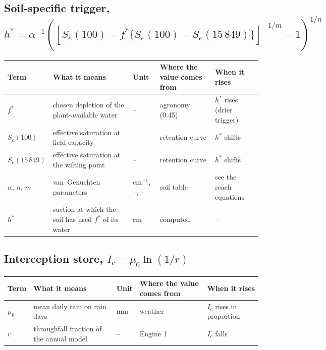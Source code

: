 \subsection*{Soil-specific trigger, $h^\ast=\alpha^{-1}([S_e(100)-f^\ast\{S_e(100)-S_e(15\,849)\}]^{-1/m}-1)^{1/n}$}
{\small\begin{longtable}{>{\raggedright\arraybackslash}p{}>{\raggedright\arraybackslash}p{}>{\raggedright\arraybackslash}p{}>{\raggedright\arraybackslash}p{}>{\raggedright\arraybackslash}p{}}\toprule Term & What it means & Unit & Where the value comes from & When it rises\\\midrule\endhead
$f^\ast$ & chosen depletion of the plant-available water & -- & agronomy (0.45) & $h^\ast$ rises (drier trigger)\\
$S_e(100)$ & effective saturation at field capacity & -- & retention curve & $h^\ast$ shifts\\
$S_e(15\,849)$ & effective saturation at the wilting point & -- & retention curve & $h^\ast$ shifts\\
$\alpha$, $n$, $m$ & van~Genuchten parameters & cm$^{-1}$, --, -- & soil table & see the reach equations\\
$h^\ast$ & suction at which the soil has used $f^\ast$ of its water & cm & computed & --\\
\bottomrule\end{longtable}}
\subsection*{Interception store, $I_c=\mu_0\ln(1/r)$}
{\small\begin{longtable}{>{\raggedright\arraybackslash}p{}>{\raggedright\arraybackslash}p{}>{\raggedright\arraybackslash}p{}>{\raggedright\arraybackslash}p{}>{\raggedright\arraybackslash}p{}}\toprule Term & What it means & Unit & Where the value comes from & When it rises\\\midrule\endhead
$\mu_0$ & mean daily rain on rain days & mm & weather & $I_c$ rises in proportion\\
$r$ & throughfall fraction of the annual model & -- & Engine 1 & $I_c$ falls\\
\bottomrule\end{longtable}}
